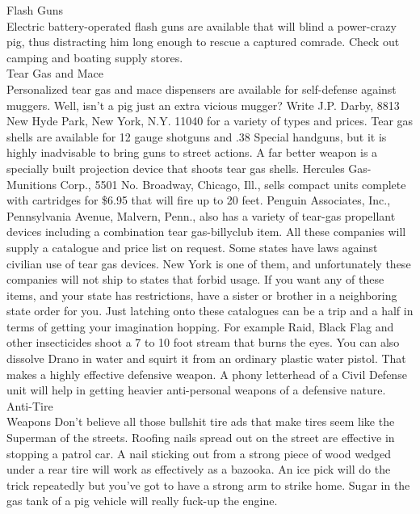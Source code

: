\documentclass[11pt,twoside,a4paper]{book}
\begin{document}
Flash Guns~\\
Electric battery-operated flash guns are available that will blind a power-crazy pig, thus distracting him long enough to rescue a captured comrade. Check out camping and boating supply stores.~\\

Tear Gas and Mace~\\
Personalized tear gas and mace dispensers are available for self-defense against muggers. Well, isn't a pig just an extra vicious mugger? Write J.P. Darby, 8813 New Hyde Park, New York, N.Y. 11040 for a variety of types and prices. Tear gas shells are available for 12 gauge shotguns and .38 Special handguns, but it is highly inadvisable to bring guns to street actions. A far better weapon is a specially built projection device that shoots tear gas shells. Hercules Gas-Munitions Corp., 5501 No. Broadway, Chicago, Ill., sells compact units complete with cartridges for \$6.95 that will fire up to 20 feet. Penguin Associates, Inc., Pennsylvania Avenue, Malvern, Penn., also has a variety of tear-gas propellant devices including a combination tear gas-billyclub item. All these companies will supply a catalogue and price list on request. Some states have laws against civilian use of tear gas devices. New York is one of them, and unfortunately these companies will not ship to states that forbid usage. If you want any of these items, and your state has restrictions, have a sister or brother in a neighboring state order for you. Just latching onto these catalogues can be a trip and a half in terms of getting your imagination hopping. For example Raid, Black Flag and other insecticides shoot a 7 to 10 foot stream that burns the eyes. You can also dissolve Drano in water and squirt it from an ordinary plastic water pistol. That makes a highly effective defensive weapon. A phony letterhead of a Civil Defense unit will help in getting heavier anti-personal weapons of a defensive nature.~\\

Anti-Tire~\\
Weapons Don't believe all those bullshit tire ads that make tires seem like the Superman of the streets. Roofing nails spread out on the street are effective in stopping a patrol car. A nail sticking out from a strong piece of wood wedged under a rear tire will work as effectively as a bazooka. An ice pick will do the trick repeatedly but you've got to have a strong arm to strike home. Sugar in the gas tank of a pig vehicle will really fuck-up the engine.~\\
\end{document}
